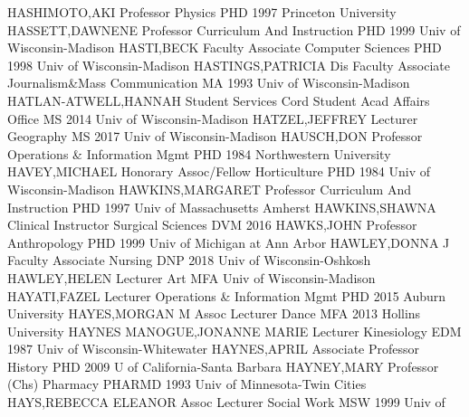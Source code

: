 \documentclass[
]{article}
\begin{document}
\textbar HASHIMOTO,AKI \textbar Professor \textbar Physics \textbar PHD
1997 Princeton University \textbar{} 
\textbar HASSETT,DAWNENE \textbar Professor \textbar Curriculum And
Instruction \textbar PHD 1999 Univ of Wisconsin-Madison \textbar{}
 \textbar HASTI,BECK \textbar Faculty Associate
\textbar Computer Sciences \textbar PHD 1998 Univ of Wisconsin-Madison
\textbar{}  \textbar HASTINGS,PATRICIA \textbar Dis Faculty
Associate \textbar Journalism\&Mass Communication \textbar MA 1993 Univ
of Wisconsin-Madison \textbar{} 
\textbar HATLAN-ATWELL,HANNAH \textbar Student Services Cord
\textbar Student Acad Affairs Office \textbar MS 2014 Univ of
Wisconsin-Madison \textbar{}  \textbar HATZEL,JEFFREY
\textbar Lecturer \textbar Geography \textbar MS 2017 Univ of
Wisconsin-Madison \textbar{}  \textbar HAUSCH,DON
\textbar Professor \textbar Operations \& Information Mgmt \textbar PHD
1984 Northwestern University \textbar{} 
\textbar HAVEY,MICHAEL \textbar Honorary Assoc/Fellow
\textbar Horticulture \textbar PHD 1984 Univ of Wisconsin-Madison
\textbar{}  \textbar HAWKINS,MARGARET \textbar Professor
\textbar Curriculum And Instruction \textbar PHD 1997 Univ of
Massachusetts Amherst \textbar{}  \textbar HAWKINS,SHAWNA
\textbar Clinical Instructor \textbar Surgical Sciences \textbar DVM
2016 \textbar{}  \textbar HAWKS,JOHN \textbar Professor
\textbar Anthropology \textbar PHD 1999 Univ of Michigan at Ann Arbor
\textbar{}  \textbar HAWLEY,DONNA J \textbar Faculty
Associate \textbar Nursing \textbar DNP 2018 Univ of Wisconsin-Oshkosh
\textbar{}  \textbar HAWLEY,HELEN \textbar Lecturer
\textbar Art \textbar MFA Univ of Wisconsin-Madison \textbar{}
 \textbar HAYATI,FAZEL \textbar Lecturer \textbar Operations
\& Information Mgmt \textbar PHD 2015 Auburn University \textbar{}
 \textbar HAYES,MORGAN M \textbar Assoc Lecturer
\textbar Dance \textbar MFA 2013 Hollins University \textbar{}
 \textbar HAYNES MANOGUE,JONANNE MARIE \textbar Lecturer
\textbar Kinesiology \textbar EDM 1987 Univ of Wisconsin-Whitewater
\textbar{}  \textbar HAYNES,APRIL \textbar Associate
Professor \textbar History \textbar PHD 2009 U of California-Santa
Barbara \textbar{}  \textbar HAYNEY,MARY \textbar Professor
(Chs) \textbar Pharmacy \textbar PHARMD 1993 Univ of Minnesota-Twin
Cities \textbar{}  \textbar HAYS,REBECCA ELEANOR
\textbar Assoc Lecturer \textbar Social Work \textbar MSW 1999 Univ of
\end{document}
